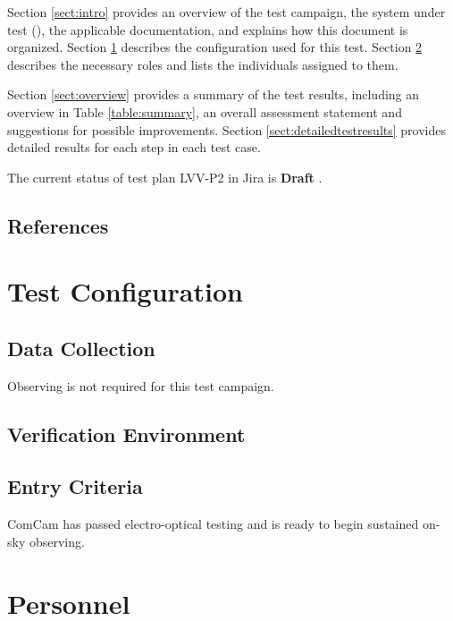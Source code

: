 \documentclass[DM,lsstdraft,STR,toc]{lsstdoc}
\begin{document}
Section \ref{sect:intro} provides an overview of the test campaign, the system under test (\product{}), the applicable documentation, and explains how this document is organized.
Section \ref{sect:configuration}  describes the configuration used for this test.
Section \ref{sect:personnel} describes the necessary roles and lists the individuals assigned to them.

Section \ref{sect:overview} provides a summary of the test results, including an overview in Table \ref{table:summary}, an overall assessment statement and suggestions for possible improvements.
Section \ref{sect:detailedtestresults} provides detailed results for each step in each test case.

The current status of test plan LVV-P2 in Jira is \textbf{ Draft }.

\subsection{References}
\label{sect:references}
\renewcommand{\refname}{}

\section{Test Configuration}
\label{sect:configuration}

\subsection{Data Collection}

  Observing is not required for this test campaign.

\subsection{Verification Environment}
\label{sect:hwconf}

  \subsection{Entry Criteria}
  ComCam has passed electro-optical testing and is ready to begin
sustained on-sky observing.




\newpage
\section{Personnel}
\label{sect:personnel}
\end{document}
